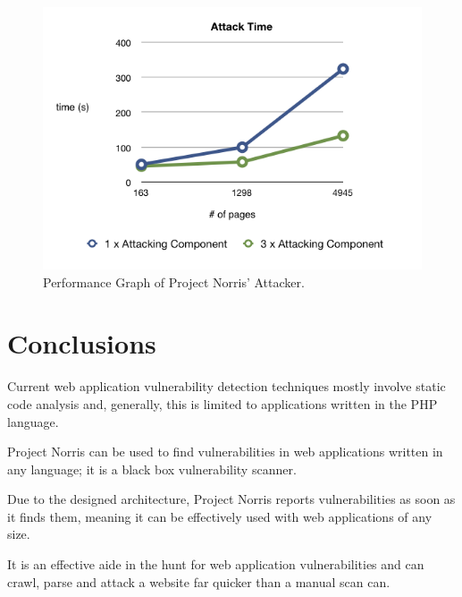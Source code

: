\documentclass[12pt,a4paper]{article}
\begin{document}
\begin{figure}[!ht]
    \begin{center}
        \includegraphics[scale=0.7]{images/attack_performance.png}    
    \end{center}
    \caption{Performance Graph of Project Norris' Attacker.}
    \label{fig:performance2}
\end{figure}

\section{Conclusions}

Current web application vulnerability detection techniques mostly involve static code analysis and, generally, this is limited to applications written in the PHP language.

Project Norris can be used to find vulnerabilities in web applications written in any language; it is a black box vulnerability scanner. 

Due to the designed architecture, Project Norris reports vulnerabilities as soon as it finds them, meaning it can be effectively used with web applications of any size.

It is an effective aide in the hunt for web application vulnerabilities and can crawl, parse and attack a website far quicker than a manual scan can.


\end{document}
